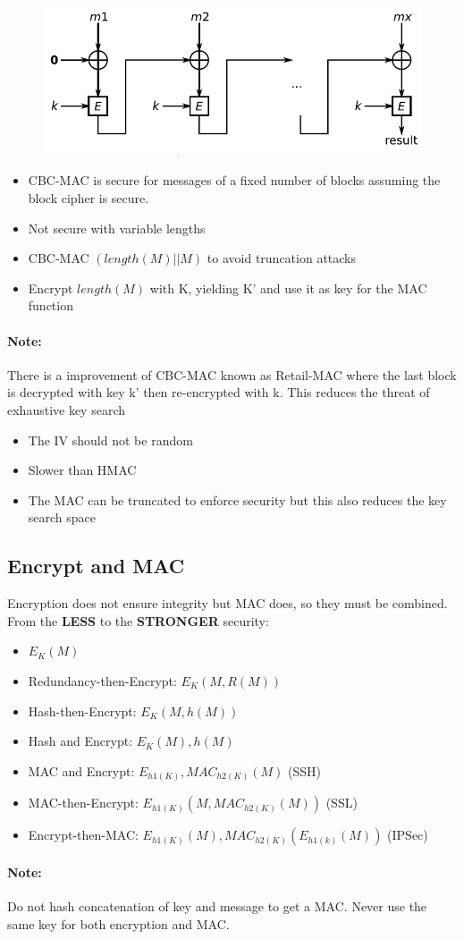 \begin{figure}[ht!]
    \centering
    \includegraphics[scale=0.5]{img/cbc-mac}
\end{figure}

\begin{itemize}
    \item CBC-MAC is secure for messages of a fixed number of blocks assuming
    the block cipher is secure.
    \item Not secure with variable lengths
    \item CBC-MAC $(length(M)||M)$ to avoid truncation attacks
    \item Encrypt $length(M)$ with K, yielding K' and use it as key for the
    MAC function
\end{itemize}
\paragraph{Note:} There is a improvement of CBC-MAC known as Retail-MAC where
the last block is decrypted with key k' then re-encrypted with k. This reduces
the threat of exhaustive key search
\begin{itemize}
    \item The IV should not be random
    \item Slower than HMAC
    \item The MAC can be truncated to enforce security but this also reduces the
    key search space
\end{itemize}

\subsection{Encrypt and MAC}
Encryption does not ensure integrity but MAC does, so they must be combined.
From the \textbf{LESS} to the \textbf{STRONGER} security:
\begin{itemize}
    \item $ E_K(M) $
    \item Redundancy-then-Encrypt: $ E_K(M,R(M)) $
    \item Hash-then-Encrypt: $ E_K(M,h(M)) $
    \item Hash and Encrypt: $ E_K(M),h(M) $
    \item MAC and Encrypt: $ E_{h1(K)},MAC_{h2(K)}(M) $ (SSH)
    \item MAC-then-Encrypt: $ E_{h1(K)}(M,MAC_{h2(K)}(M)) $ (SSL)
    \item Encrypt-then-MAC\@: $ E_{h1(K)}(M),MAC_{h2(K)}(E_{h1(k)}(M)) $ (IPSec)
\end{itemize}
\paragraph{Note:} Do not hash concatenation of key and message to get a MAC\@.
Never use the same key for both encryption and MAC\@.
